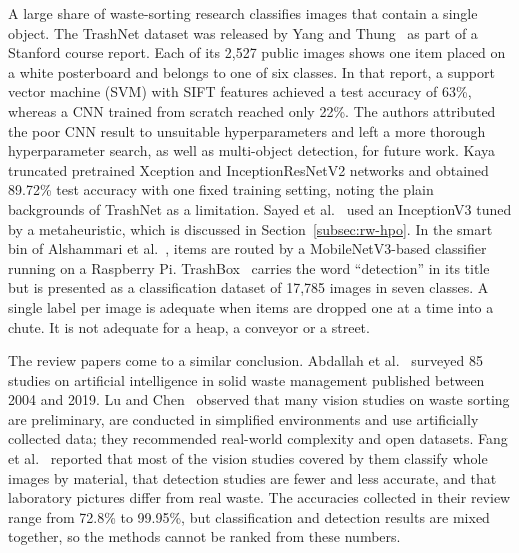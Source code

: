 A large share of waste-sorting research classifies images that contain a single object. The TrashNet dataset was released by Yang and Thung~\cite{yang2016classification} as part of a Stanford course report. Each of its 2,527 public images shows one item placed on a white posterboard and belongs to one of six classes. In that report, a support vector machine (SVM) with SIFT features achieved a test accuracy of 63\%, whereas a CNN trained from scratch reached only 22\%. The authors attributed the poor CNN result to unsuitable hyperparameters and left a more thorough hyperparameter search, as well as multi-object detection, for future work. Kaya~\cite{kaya2023classification} truncated pretrained Xception and InceptionResNetV2 networks and obtained 89.72\% test accuracy with one fixed training setting, noting the plain backgrounds of TrashNet as a limitation. Sayed et al.~\cite{sayed2024intelligent} used an InceptionV3 tuned by a metaheuristic, which is discussed in Section~\ref{subsec:rw-hpo}. In the smart bin of Alshammari et al.~\cite{alshammari2025smart}, items are routed by a MobileNetV3-based classifier running on a Raspberry Pi. TrashBox~\cite{kumsetty2022trashbox} carries the word ``detection'' in its title but is presented as a classification dataset of 17,785 images in seven classes. A single label per image is adequate when items are dropped one at a time into a chute. It is not adequate for a heap, a conveyor or a street.

The review papers come to a similar conclusion. Abdallah et al.~\cite{abdallah2020artificial} surveyed 85 studies on artificial intelligence in solid waste management published between 2004 and 2019. Lu and Chen~\cite{lu2022computer} observed that many vision studies on waste sorting are preliminary, are conducted in simplified environments and use artificially collected data; they recommended real-world complexity and open datasets. Fang et al.~\cite{fang2023artificial} reported that most of the vision studies covered by them classify whole images by material, that detection studies are fewer and less accurate, and that laboratory pictures differ from real waste. The accuracies collected in their review range from 72.8\% to 99.95\%, but classification and detection results are mixed together, so the methods cannot be ranked from these numbers.

